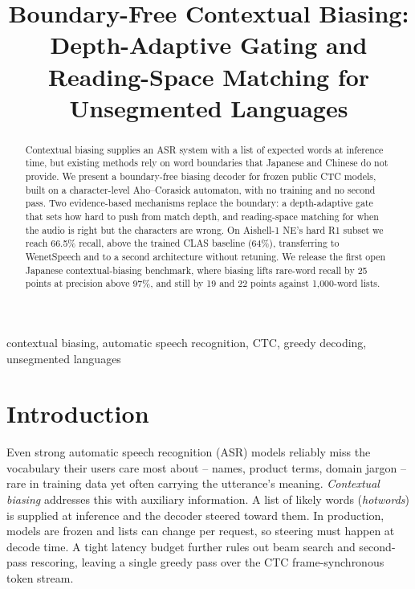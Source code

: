 \documentclass{article}
\title{Boundary-Free Contextual Biasing: Depth-Adaptive Gating and Reading-Space Matching for Unsegmented Languages}
\begin{document}
\ninept
%
\maketitle
%
\begin{abstract}
Contextual biasing supplies an ASR system with a list of expected words at inference time, but existing methods rely on word boundaries that Japanese and Chinese do not provide. We present a boundary-free biasing decoder for frozen public CTC models, built on a character-level Aho–Corasick automaton, with no training and no second pass. Two evidence-based mechanisms replace the boundary: a depth-adaptive gate that sets how hard to push from match depth, and reading-space matching for when the audio is right but the characters are wrong. On Aishell-1 NE's hard R1 subset we reach 66.5\% recall, above the trained CLAS baseline (64\%), transferring to WenetSpeech and to a second architecture without retuning. We release the first open Japanese contextual-biasing benchmark, where biasing lifts rare-word recall by 25 points at precision above 97\%, and still by 19 and 22 points against 1,000-word lists.
\end{abstract}
%
\begin{keywords}
contextual biasing, automatic speech recognition, CTC, greedy decoding, unsegmented languages
\end{keywords}
%
\section{Introduction}
\label{sec:intro}

Even strong automatic speech recognition (ASR) models reliably miss the vocabulary their users care most about -- names, product terms, domain jargon -- rare in training data yet often carrying the utterance's meaning. \textit{Contextual biasing} addresses this with auxiliary information. A list of likely words (\textit{hotwords}) is supplied at inference and the decoder steered toward them. In production, models are frozen and lists can change per request, so steering must happen at decode time. A tight latency budget further rules out beam search and second-pass rescoring, leaving a single greedy pass over the CTC \cite{ctc} frame-synchronous token stream.
\end{document}
